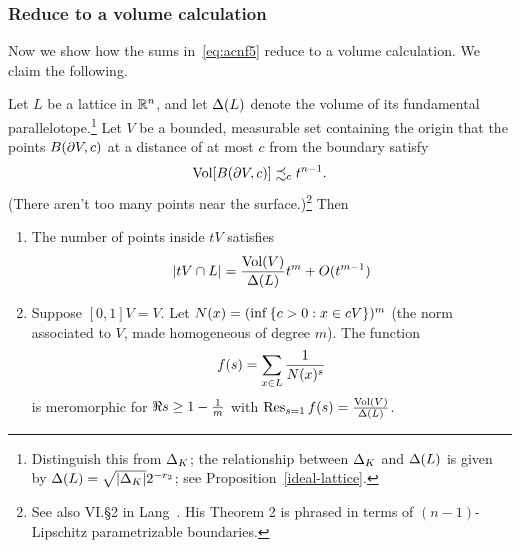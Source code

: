 \subsubsection{Reduce to a volume calculation}
Now we show how the sums in~\eqref{eq:acnf5} reduce to a volume calculation. We claim the following.
\begin{lem}
Let $L$ be a lattice in $\mathbb{R}^n$, and let $\Delta(L)$ denote the volume of its fundamental parallelotope.\footnote{Distinguish this from $\Delta_K$; the relationship between $\Delta_K$ and $\Delta(L)$ is given by $\Delta(L)=\sqrt{|\Delta_K|}2^{-r_2}$; see Proposition~\ref{ideal-lattice}.} Let $V$ be a bounded, measurable set containing the origin that the points $B(\partial V,c)$ at a distance of at most $c$ from the boundary satisfy 
\[
\text{Vol}[B(\partial V,c)]\precsim_c t^{n-1}.
\]
(There aren't too many points near the surface.)\footnote{See also VI.\S2 in Lang~\cite{La84}. His Theorem 2 is phrased in terms of $(n-1)$-Lipschitz parametrizable boundaries.} 
Then
\begin{enumerate}
\item
The number of points inside $tV$ satisfies
\[
|tV\cap L|= \frac{\text{Vol}(V)}{\Delta(L)}t^m+O(t^{m-1})
\]
\item Suppose $[0,1]V=V$.
Let $N(x)=(\inf\left\{{c>0}:{x\in cV}\right\})^m$ (the norm associated to $V$, made homogeneous of degree $m$).
The function
\[
f(s)=\sum_{x\in L}\frac{1}{N(x)^s}
\]
is meromorphic for $\Re s\ge 1-\frac{1}{m}$ with $\operatorname{Res}_{s=1}f(s)=\frac{\text{Vol}(V)}{\Delta(L)}$.
\end{enumerate}
\end{lem}
